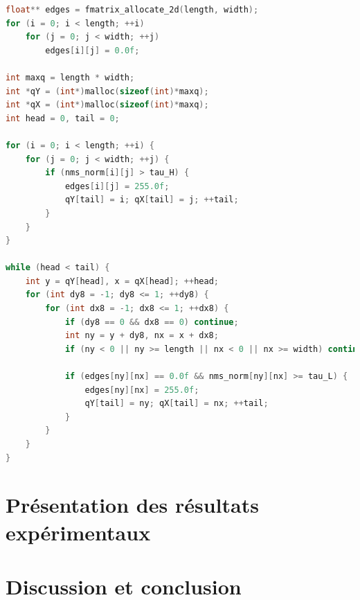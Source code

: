\documentclass{article}
\begin{document}
\begin{lstlisting}[language=C]
float** edges = fmatrix_allocate_2d(length, width);
for (i = 0; i < length; ++i)
    for (j = 0; j < width; ++j)
        edges[i][j] = 0.0f;

int maxq = length * width;
int *qY = (int*)malloc(sizeof(int)*maxq);
int *qX = (int*)malloc(sizeof(int)*maxq);
int head = 0, tail = 0;

for (i = 0; i < length; ++i) {
    for (j = 0; j < width; ++j) {
        if (nms_norm[i][j] > tau_H) {
            edges[i][j] = 255.0f;
            qY[tail] = i; qX[tail] = j; ++tail;
        }
    }
}

while (head < tail) {
    int y = qY[head], x = qX[head]; ++head;
    for (int dy8 = -1; dy8 <= 1; ++dy8) {
        for (int dx8 = -1; dx8 <= 1; ++dx8) {
            if (dy8 == 0 && dx8 == 0) continue;
            int ny = y + dy8, nx = x + dx8;
            if (ny < 0 || ny >= length || nx < 0 || nx >= width) continue;

            if (edges[ny][nx] == 0.0f && nms_norm[ny][nx] >= tau_L) {
                edges[ny][nx] = 255.0f;
                qY[tail] = ny; qX[tail] = nx; ++tail;
            }
        }
    }
}
\end{lstlisting}
\section{Présentation des résultats expérimentaux}
\section{Discussion et conclusion}
\end{document}
